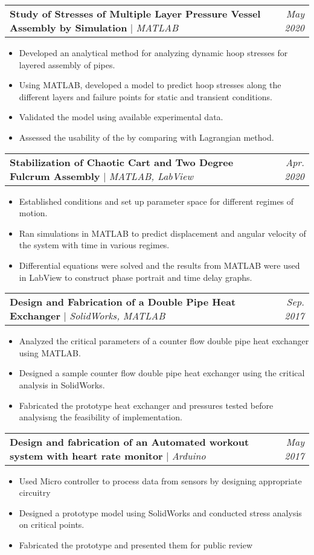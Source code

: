 \documentclass[letterpaper,11pt]{article}
\makeatletter
\newcommand{\resumeItem}[1]{
  \item\small{
    {#1 \vspace{-2pt}}
  }
}
\newcommand{\resumeProjectHeading}[2]{
    \item
    \begin{tabular*}{1.001\textwidth}{l@{\extracolsep{\fill}}r}
      \small#1 & {\small #2}\\
    \end{tabular*}\vspace{-7pt}
}
\newcommand{\resumeItemListStart}{\begin{itemize}}
\newcommand{\resumeItemListEnd}{\end{itemize}\vspace{-5pt}}
\makeatother
\begin{document}
      \resumeProjectHeading
          {\textbf{Study of Stresses of Multiple Layer Pressure Vessel Assembly by Simulation} $|$ \emph{MATLAB}}{\textit{May 2020}}
          \resumeItemListStart
            \resumeItem{Developed an analytical method for analyzing dynamic hoop stresses for layered assembly of pipes.}
            \resumeItem{Using MATLAB, developed a model to predict hoop stresses along the different layers and failure points for static and transient conditions.}
            \resumeItem{Validated the model using available experimental data.}
            \resumeItem{Assessed the usability of the by comparing with Lagrangian method.}
          \resumeItemListEnd
          \vspace{-14pt}
          
      \resumeProjectHeading
          {\textbf{Stabilization of Chaotic Cart and Two Degree Fulcrum Assembly} $|$ \emph{MATLAB, LabView}}{\textit{Apr. 2020}}
          \resumeItemListStart
            \resumeItem{Established conditions and set up parameter space for different regimes of motion.}
            \resumeItem{Ran simulations in MATLAB to predict displacement and angular velocity of the system with time in various regimes.}
            \resumeItem{Differential equations were solved and the results from MATLAB were used in LabView to construct phase portrait and time delay graphs.}
          \resumeItemListEnd
          \vspace{-14pt}
          
     
     \resumeProjectHeading
          {\textbf{Design and Fabrication of a Double Pipe Heat Exchanger} $|$ \emph{SolidWorks, MATLAB}}{\textit{Sep. 2017}}
          \resumeItemListStart
            \resumeItem{Analyzed the critical parameters of a counter flow double pipe heat exchanger using MATLAB.}
            \resumeItem{Designed a sample counter flow double pipe heat exchanger using the critical analysis in SolidWorks.}
            \resumeItem{Fabricated the prototype heat exchanger and pressures tested before analysisng the feasibility of implementation.}
        \vspace{-14pt}
        \resumeItemListEnd 
        
        \resumeProjectHeading
          {\textbf{Design and fabrication of an Automated workout system with heart rate monitor} $|$ \emph{Arduino}}{\textit{May 2017}}
          \resumeItemListStart
            \resumeItem{Used Micro controller to process data from sensors by designing appropriate circuitry }
            \resumeItem{Designed a prototype model using SolidWorks and conducted stress analysis on critical points.}
            \resumeItem{Fabricated the prototype and presented them for public review}
          \resumeItemListEnd 
          
\end{document}
